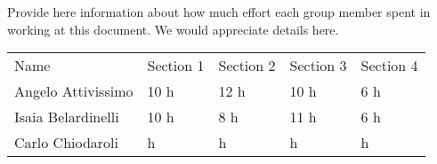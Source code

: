 Provide here information about how much effort each group member spent in working at this document. We would appreciate details here.


\begin{center}
    \begin{tabu}{|X[1.5]|X|X|X|X|} \hline \everyrow{\hline}
        Name & Section 1 & Section 2 & Section 3 & Section 4 \\ 
        Angelo Attivissimo & 10 h & 12 h & 10 h & 6 h \\
        Isaia Belardinelli & 10 h & 8 h & 11 h & 6 h \\
        Carlo Chiodaroli & h & h & h & h \\ 
    \end{tabu}
\end{center}